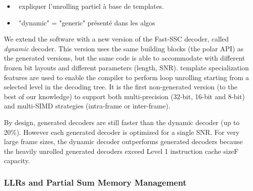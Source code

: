 \begin{itemize}
  \item \xmark~expliquer l'unrolling partiel à base de templates.
  \item \xmark~"dynamic" = "generic" présenté dans les algos
\end{itemize}

We extend the \AFFECT software with a new version of the Fast-SSC decoder,
called \emph{dynamic} decoder. This version uses the same building blocks (the
polar API) as the generated versions, but the same code is able to accommodate
with different frozen bit layouts and different parameters (length, SNR).
 template specialization features are used to enable the compiler to
perform loop unrolling starting from a selected level in the decoding tree. It
is the first non-generated version (to the best of our knowledge) to support
both multi-precision (32-bit, 16-bit and 8-bit) and multi-SIMD strategies
(intra-frame or inter-frame).

By design, generated decoders are still faster than the dynamic decoder (up to
20\%). However each generated decoder is optimized for a single SNR. For very
large frame sizes, the dynamic decoder outperforms generated decoders because
the heavily unrolled generated decoders exceed Level 1 instruction cache sizeF
capacity.

\subsubsection{LLRs and Partial Sum Memory Management}

